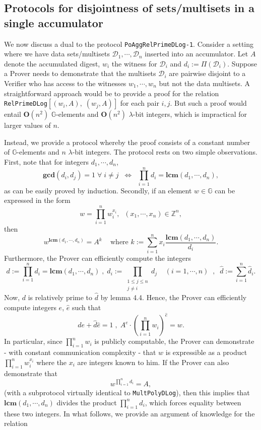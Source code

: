 \documentclass[11pt, lettersize, notitlepage, leqno, footskip=0.6cm]{article}
\newcommand{\bz}{\mathbb Z}
\newcommand{\pl}{\prod\limits}
\newcommand{\slim}{\sum\limits}
\newcommand{\LRA}{\Longleftrightarrow}
\newcommand{\mc}{\mathcal}
\newcommand{\mb}{\mathbb}
\newcommand{\mbf}{\mathbf}
\newcommand{\lam}{\lambda}
\newcommand{\what}{\widehat}
\newcommand{\vs}{\vspace{-0.15cm}}
\newcommand{\LCM}{\mbf{lcm}}
\newcommand{\GCD}{\mbf{gcd}}
\numberwithin{equation}{section}
\begin{document}
\subsection{\fontsize{11}{11}\selectfont Protocols for disjointness of sets/multisets in a single accumulator} 


We now discuss a dual to the protocol \verb|PoAggRelPrimeDLog-1|. Consider a setting where we have data sets/multisets $\mc{D}_1,\cdots, \mc{D}_n$ inserted into an accumulator. Let $A$ denote the accumulated digest, $w_i$ the witness for $\mc{D}_i$ and $d_i:= \Pi(\mc{D}_i)$. Suppose a Prover needs to demonstrate that the multisets $\mc{D}_i$ are pairwise disjoint to a Verifier who has access to the witnesses $w_1,\cdots,w_n$ but not the data multisets. A straightforward approach would be to provide a proof for the relation \verb|RelPrimeDLog|$[(w_i, A),\;(w_j, A)]$ for each pair $i,j$. But such a proof would entail $\mbf{O}(n^2)$ $\mb{G}$-elements and $\mbf{O}(n^2)$ $\lam$-bit integers, which is impractical for larger values of $n$.

Instead, we provide a protocol whereby the proof consists of a constant number of $\mb{G}$-elements and $n$ $\lam$-bit integers. The protocol rests on two simple observations. First, note that for integers $d_1,\cdots,d_n$, \vs $$\GCD(d_i,d_j)=1\;\forall\;i\neq j\;\; \LRA\;\; \pl_{i=1}^n d_i= \LCM(d_1,\cdots,d_n),$$ as can be easily proved by induction. Secondly, if an element $w\in \mb{G}$ can be expressed in the form \vspace{-0.15cm}$$w = \prod\limits_{i=1}^n w_i^{x_i},\;\;(x_1,\cdots,x_n)\in\bz^n,$$ then \vs $$w^{\LCM(d_1,\cdots,d_n)} = A^{k} \;\;\;\text{ where } k := \slim_{i=1}^n x_i\frac{\LCM(d_1,\cdots,d_n)}{d_i}.$$ Furthermore, the Prover can efficiently compute the integers \vs $$d:= \pl_{i=1}^n d_i = \LCM(d_1,\cdots,d_n)\;,\;\what{d}_i:= \pl_{\substack{1\leq j\leq n\\ j\neq i}} d_j\;\;\;\; (i=1,\cdots,n)\;\;,\;\; \what{d} := \slim_{i=1}^n \what{d}_i.$$ Now, $d$ is relatively prime to $\what{d}$ by lemma 4.4. Hence, the Prover can efficiently compute integers $e$, $\what{e}$ such that $$de+\what{d}\what{e} = 1\;,\; A^e \cdot (\pl_{i=1}^n w_i)^{\what{e}} = w.  $$ In particular, since $\prod_{i=1}^n w_i$ is publicly computable, the Prover can demonstrate - with constant communication complexity - that $w$ is expressible as a product $\prod_{i=1}^n w_i^{x_i}$ where the $x_i$ are integers known to him. If the Prover can also demonstrate that \vs $$w^{\prod\limits_{i=1}^n d_i} = A,$$ (with a subprotocol virtually identical to \verb|MultPolyDLog|), then this implies that $\LCM(d_1,\cdots,d_n)$ divides the product $\prod_{i=1}^n d_i$, which forces equality between these two integers. In what follows, we provide an argument of knowledge for the relation  
\end{document}
